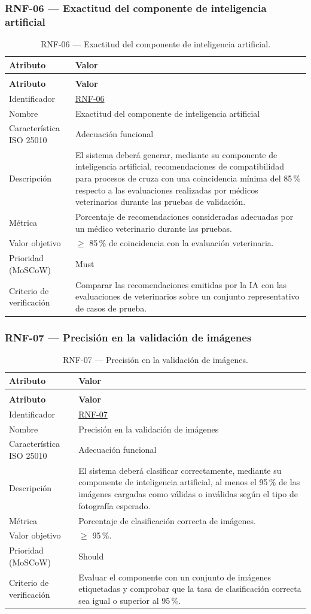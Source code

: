 \documentclass[journal,onecolumn]{IEEEtran}
\makeatletter
\newenvironment{atributos}[2]{%
	\small
	\begin{longtable}{@{}>{\raggedright\arraybackslash}p{4.2cm} >{\raggedright\arraybackslash}p{11.2cm}@{}}
		\caption{#2}\label{tab:#1}\\
		\toprule
		\textbf{Atributo} & \textbf{Valor} \\
		\midrule
		\endfirsthead
		\multicolumn{2}{@{}l}{\small\itshape (continuación)}\\
		\toprule
		\textbf{Atributo} & \textbf{Valor} \\
		\midrule
		\endhead
		\bottomrule
		\endlastfoot
	}{%
	\end{longtable}
	\normalsize
}
\makeatother
\begin{document}
	\subsubsection{RNF-06 --- Exactitud del componente de inteligencia artificial}
	
	\begin{atributos}{RNF-06}{RNF-06 --- Exactitud del componente de inteligencia artificial.}
		Identificador & \hyperref[tab:RNF-06]{RNF-06} \\
		Nombre & Exactitud del componente de inteligencia artificial \\
		Característica ISO 25010 & Adecuación funcional \\
		Descripción & El sistema deberá generar, mediante su componente de inteligencia artificial, recomendaciones de compatibilidad para procesos de cruza con una coincidencia mínima del 85\,\% respecto a las evaluaciones realizadas por médicos veterinarios durante las pruebas de validación. \\
		Métrica & Porcentaje de recomendaciones consideradas adecuadas por un médico veterinario durante las pruebas. \\
		Valor objetivo & $\geq$ 85\,\% de coincidencia con la evaluación veterinaria. \\
		Prioridad (MoSCoW) & Must \\
		Criterio de verificación & Comparar las recomendaciones emitidas por la IA con las evaluaciones de veterinarios sobre un conjunto representativo de casos de prueba. \\
	\end{atributos}
	
	\subsubsection{RNF-07 --- Precisión en la validación de imágenes}
	
	\begin{atributos}{RNF-07}{RNF-07 --- Precisión en la validación de imágenes.}
		Identificador & \hyperref[tab:RNF-07]{RNF-07} \\
		Nombre & Precisión en la validación de imágenes \\
		Característica ISO 25010 & Adecuación funcional \\
		Descripción & El sistema deberá clasificar correctamente, mediante su componente de inteligencia artificial, al menos el 95\,\% de las imágenes cargadas como válidas o inválidas según el tipo de fotografía esperado. \\
		Métrica & Porcentaje de clasificación correcta de imágenes. \\
		Valor objetivo & $\geq$ 95\,\%. \\
		Prioridad (MoSCoW) & Should \\
		Criterio de verificación & Evaluar el componente con un conjunto de imágenes etiquetadas y comprobar que la tasa de clasificación correcta sea igual o superior al 95\,\%. \\
	\end{atributos}
	
\end{document}
